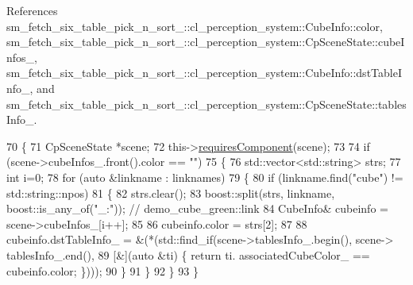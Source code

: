References sm\+\_\+fetch\+\_\+six\+\_\+table\+\_\+pick\+\_\+n\+\_\+sort\+\_\+::cl\+\_\+perception\+\_\+system\+::\+Cube\+Info\+::color, sm\+\_\+fetch\+\_\+six\+\_\+table\+\_\+pick\+\_\+n\+\_\+sort\+\_\+::cl\+\_\+perception\+\_\+system\+::\+Cp\+Scene\+State\+::cube\+Infos\+\_\+, sm\+\_\+fetch\+\_\+six\+\_\+table\+\_\+pick\+\_\+n\+\_\+sort\+\_\+::cl\+\_\+perception\+\_\+system\+::\+Cube\+Info\+::dst\+Table\+Info\+\_\+, and sm\+\_\+fetch\+\_\+six\+\_\+table\+\_\+pick\+\_\+n\+\_\+sort\+\_\+::cl\+\_\+perception\+\_\+system\+::\+Cp\+Scene\+State\+::tables\+Info\+\_\+.


\begin{DoxyCode}
70             \{
71                 CpSceneState *scene;
72                 this->\hyperlink{classsmacc_1_1ISmaccComponent_aa06d58b1dcec3c513ca2edddfd3847ec}{requiresComponent}(scene);
73 
74                 \textcolor{keywordflow}{if} (scene->cubeInfos\_.front().color == \textcolor{stringliteral}{""})
75                 \{
76                     std::vector<std::string> strs;
77                     \textcolor{keywordtype}{int} i=0;
78                     \textcolor{keywordflow}{for} (\textcolor{keyword}{auto} &linkname : linknames)
79                     \{
80                         \textcolor{keywordflow}{if} (linkname.find(\textcolor{stringliteral}{"cube"}) != std::string::npos)
81                         \{
82                             strs.clear();
83                             boost::split(strs, linkname, boost::is\_any\_of(\textcolor{stringliteral}{"\_:"})); \textcolor{comment}{// demo\_cube\_green::link}
84                             CubeInfo& cubeinfo = scene->cubeInfos\_[i++];
85 
86                             cubeinfo.color = strs[2];
87 
88                             cubeinfo.dstTableInfo\_ = &(*(std::find\_if(scene->tablesInfo\_.begin(), scene->
      tablesInfo\_.end(),
89                                                                       [&](\textcolor{keyword}{auto} &ti) \{ \textcolor{keywordflow}{return} ti.
      associatedCubeColor\_ == cubeinfo.color; \})));
90                         \}
91                     \}
92                 \}
93             \}
\end{DoxyCode}
\mbox{\label{classsm__fetch__six__table__pick__n__sort__1_1_1cl__perception__system_1_1CpSimulatedGazeboPerception_a59ebcf12c7fe1f7933ae4d741bc8aaea}} 
